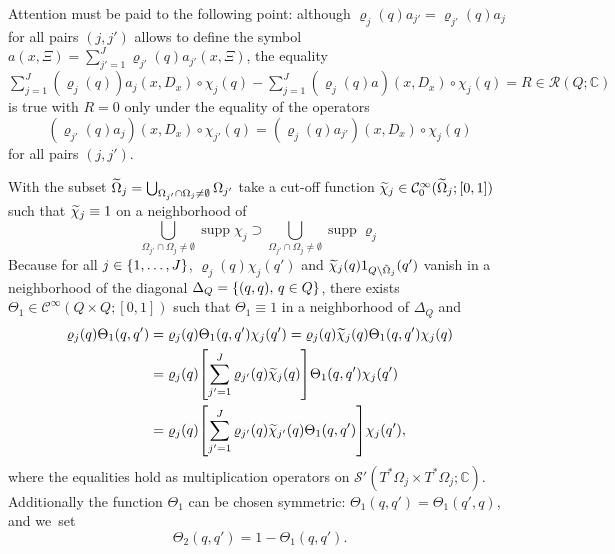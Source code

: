 \documentclass[10pt]{amsart}
\theoremstyle{definition}\newtheorem{defi}[theo]{Definition}\newtheorem{rema}[theo]{Remark}\newtheorem{exam}[theo]{Example}\newtheorem{exem}[theo]{Example}\newtheorem{nota}[theo]{Notation}
\newcommand{\C}{\mathbb{C}}
\newcommand{\clC}{\mathcal{C}}
\newcommand{\clS}{\mathcal{S}}
\newcommand{\clR}{\mathcal{R}}
\DeclareMathOperator{\suppp}{supp}
\let\oldtilde\tilde
\renewcommand*{\tilde}[1]{\mathchoice{\widetilde{#1}}{\widetilde{#1}}{\oldtilde{#1}}{\oldtilde{#1}}}
\let\originalleft\left
\let\originalright\right
\renewcommand{\left}{\mathopen{}\mathclose\bgroup\originalleft}
\renewcommand{\right}{\aftergroup\egroup\originalright}
\begin{document}
Attention must be paid to the following point: although $\varrho_{j}(q)a_{j'}=\varrho_{j'}(q)a_{j}$ for all pairs $(j,j')$ allows to define the symbol $a(x,\Xi)=\sum_{j'=1}^{J}\varrho_{j'}(q)a_{j'}(x,\Xi)$, the equality $\sum_{j=1}^{J}(\varrho_{j}(q))a_{j}(x,D_{x})\circ\chi_{j}(q)-\sum_{j=1}^{J}(\varrho_{j}(q)a)(x,D_{x})\circ\chi_{j}(q)=R\in \clR(Q;\C)$ is true with $R=0$ only under the equality of the operators
\[
(\varrho_{j'}(q)a_{j})(x,D_{x})\circ\chi_{j'}(q)=(\varrho_{j}(q)a_{j'})(x,D_{x})\circ\chi_{j}(q)
\]
for all pairs $(j,j')$.

With the subset $\tilde{\Omega}_{j}=\bigcup_{\Omega_{j'}\cap \Omega_{j}\neq\emptyset}\Omega_{j'}$ take a cut-off function $\tilde{\chi}_{j}\in \clC^{\infty}_{0}(\tilde{\Omega}_{j};[0,1])$ such that $\tilde{\chi}_{j}\equiv 1$ on a neighborhood of
\[
\bigcup_{\Omega_{j'}\cap \Omega_{j}\neq \emptyset}\suppp\chi_{j}
\supset
\bigcup_{\Omega_{j'}\cap \Omega_{j}\neq \emptyset}\suppp\varrho_{j}
\]
Because for all $j\in \left\{1,\dots,J\right\}$, $\varrho_{j}(q)\chi_{j}(q')$ and $\tilde{\chi}_{j}(q)1_{Q\setminus\tilde{\Omega}_{j}}(q')$ vanish in a neighborhood of the diagonal $\Delta_{Q}=\left\{(q,q),\, q\in Q\right\}$, there exists $\Theta_{1}\in \clC^{\infty}(Q\times Q;[0,1])$ such that $\Theta_{1}\equiv 1$ in a neighborhood of $\Delta_{Q}$ and
\begin{equation}
\begin{aligned}[t]
\varrho_{j}(q)\Theta_{1}(q,q')&=\varrho_{j}(q)\Theta_{1}(q,q')\chi_{j}(q')=\varrho_{j}(q)\tilde{\chi}_{j}(q)\Theta_{1}(q,q')\chi_{j}(q)\\
 &=\varrho_{j}(q)\left[\sum_{j'=1}^{J}\varrho_{j'}(q)\tilde{\chi}_{j}(q)\right]\Theta_{1}(q,q')\chi_{j}(q')\\\label{eq:rhojchij}
&=\varrho_{j}(q)\left[\sum_{j'=1}^{J}\varrho_{j'}(q)\tilde{\chi}_{j'}(q)\Theta_{1}(q,q')\right]\chi_{j}(q'),
\end{aligned}
\end{equation}
where the equalities hold as multiplication operators on $\clS'(T^{*}\Omega_{j}\times T^{*}\Omega_{j};\C)$. Additionally the function $\Theta_{1}$ can be chosen symmetric: $\Theta_{1}(q,q')=\Theta_{1}(q',q)$, and we~set
\[
\Theta_2(q,q') = 1-\Theta_1(q,q').
\]
\end{document}
